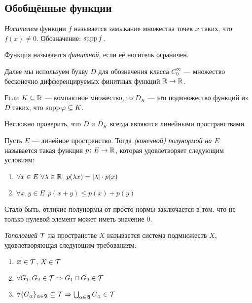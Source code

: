 \subsection{Обобщённые функции}

\begin{definition}
	\textit{Носителем} функции $f$ называется замыкание множества точек $x$ таких, что $f(x) \neq 0$. Обозначение: $\operatorname{supp} f$.
\end{definition}

\begin{definition}
	Функция называется \textit{финитной}, если её носитель ограничен.
\end{definition}

\begin{designation}
	Далее мы используем букву $D$ для обозначения класса $C_0^\infty$ --- множество бесконечно дифференцируемых финитных функций $\mathbb{R} \to \mathbb{R}$.
\end{designation}

\begin{designation}
	Если $K \subseteq \mathbb{R}$ --- компактное множество, то $D_K$ --- это подмножество функций из $D$ таких, что $\operatorname{supp} \varphi \subseteq K$.
\end{designation}

\begin{note}
	Несложно проверить, что $D$ и $D_K$ всегда являются линейными пространствами.
\end{note}

\begin{definition}
	Пусть $E$ --- линейное пространство. Тогда \textit{(конечной) полунормой на $E$} называется такая функция $p \colon E \to \mathbb{R}$, которая удовлетворяет следующим условиям:
	\begin{enumerate}
		\item $\forall x \in E\ \forall \lambda \in \mathbb{R}\ \ p(\lambda x) = |\lambda| \cdot p(x)$
		
		\item $\forall x, y \in E\ \ p(x + y) \le p(x) + p(y)$
	\end{enumerate}
\end{definition}

\begin{note}
	Стало быть, отличие полунормы от просто нормы заключается в том, что не только нулевой элемент может иметь значение 0.
\end{note}

\begin{reminder}
	\textit{Топологией} $\mathcal{T}$ на пространстве $X$ называется система подмножеств $X$, удовлетворяющая следующим требованиям:
	\begin{enumerate}
		\item $\varnothing \in \mathcal{T}$, $X \in \mathcal{T}$
		
		\item $\forall G_1, G_2 \in \mathcal{T} \Rightarrow G_1 \cap G_2 \in \mathcal{T}$
		
		\item $\forall \{G_\alpha\}_{\alpha \in \mathfrak{A}} \subseteq \mathcal{T} \Rightarrow \bigcup_{\alpha \in \mathfrak{A}} G_\alpha \in \mathcal{T}$
	\end{enumerate}
\end{reminder}

